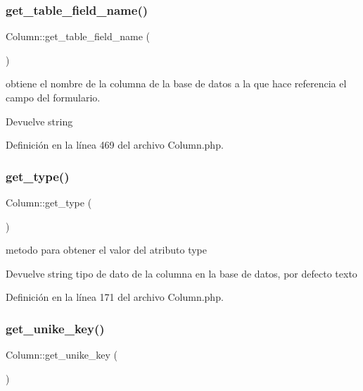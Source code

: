 \subsubsection{\texorpdfstring{get\_table\_field\_name()}{get\_table\_field\_name()}}
{\footnotesize\ttfamily Column\+::get\+\_\+table\+\_\+field\+\_\+name (\begin{DoxyParamCaption}{ }\end{DoxyParamCaption})}

obtiene el nombre de la columna de la base de datos a la que hace referencia el campo del formulario.

\begin{DoxyReturn}{Devuelve}
string 
\end{DoxyReturn}


Definición en la línea 469 del archivo Column.\+php.

\mbox{\label{class_column_ae0f1d35fdaae4ba874bba1f0a4db051b}} 
\subsubsection{\texorpdfstring{get\_type()}{get\_type()}}
{\footnotesize\ttfamily Column\+::get\+\_\+type (\begin{DoxyParamCaption}{ }\end{DoxyParamCaption})}

metodo para obtener el valor del atributo type

\begin{DoxyReturn}{Devuelve}
string tipo de dato de la columna en la base de datos, por defecto texto 
\end{DoxyReturn}


Definición en la línea 171 del archivo Column.\+php.

\mbox{\label{class_column_adc97cb771ea70684dcb2ff4591880418}} 
\subsubsection{\texorpdfstring{get\_unike\_key()}{get\_unike\_key()}}
{\footnotesize\ttfamily Column\+::get\+\_\+unike\+\_\+key (\begin{DoxyParamCaption}{ }\end{DoxyParamCaption})}

